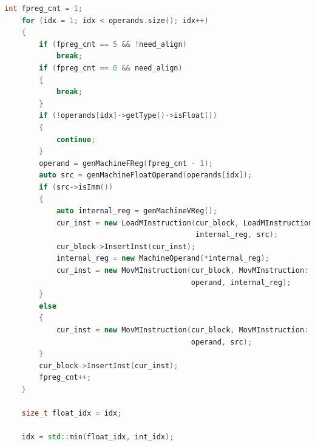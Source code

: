 \documentclass[UTF8,a4paper,10pt]{ctexart}
\begin{document}
\begin{lstlisting}[title = 生成目标代码, language = c++]
    int fpreg_cnt = 1;
    for (idx = 1; idx < operands.size(); idx++)
    {
        if (fpreg_cnt == 5 && !need_align)
            break;
        if (fpreg_cnt == 6 && need_align)
        {
            break;
        }
        if (!operands[idx]->getType()->isFloat())
        {
            continue;
        }
        operand = genMachineFReg(fpreg_cnt - 1);
        auto src = genMachineFloatOperand(operands[idx]);
        if (src->isImm())
        {
            auto internal_reg = genMachineVReg();
            cur_inst = new LoadMInstruction(cur_block, LoadMInstruction::LDR,
                                            internal_reg, src);
            cur_block->InsertInst(cur_inst);
            internal_reg = new MachineOperand(*internal_reg);
            cur_inst = new MovMInstruction(cur_block, MovMInstruction::VMOV,
                                           operand, internal_reg);
        }
        else
        {
            cur_inst = new MovMInstruction(cur_block, MovMInstruction::VMOV,
                                           operand, src);
        }
        cur_block->InsertInst(cur_inst);
        fpreg_cnt++;
    }

    size_t float_idx = idx;

    idx = std::min(float_idx, int_idx);


\end{lstlisting}
\end{document}
